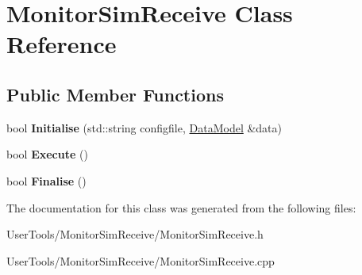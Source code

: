 \hypertarget{classMonitorSimReceive}{
\section{MonitorSimReceive Class Reference}
\label{classMonitorSimReceive}
}
\subsection*{Public Member Functions}
\begin{DoxyCompactItemize}
\item 
\hypertarget{classMonitorSimReceive_a3e841c945c5481d97fc82cb4658bdaee}{
bool {\bfseries Initialise} (std::string configfile, \hyperlink{classDataModel}{DataModel} \&data)}
\label{classMonitorSimReceive_a3e841c945c5481d97fc82cb4658bdaee}

\item 
\hypertarget{classMonitorSimReceive_a289c3a6508deff086d9250263cc9981e}{
bool {\bfseries Execute} ()}
\label{classMonitorSimReceive_a289c3a6508deff086d9250263cc9981e}

\item 
\hypertarget{classMonitorSimReceive_afb3fd0f4191c888966b83a0bc8ff032d}{
bool {\bfseries Finalise} ()}
\label{classMonitorSimReceive_afb3fd0f4191c888966b83a0bc8ff032d}

\end{DoxyCompactItemize}


The documentation for this class was generated from the following files:\begin{DoxyCompactItemize}
\item 
UserTools/MonitorSimReceive/MonitorSimReceive.h\item 
UserTools/MonitorSimReceive/MonitorSimReceive.cpp\end{DoxyCompactItemize}
